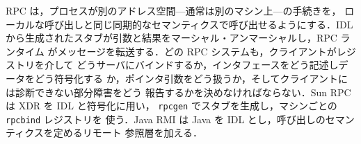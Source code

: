 \documentclass[../main.tex]{subfiles}
\begin{document}
\begin{keypoint}[章のまとめ]
  RPC は，プロセスが別のアドレス空間---通常は別のマシン上---の手続きを，
  ローカルな呼び出しと同じ同期的なセマンティクスで呼び出せるようにする．IDL
  から生成されたスタブが引数と結果をマーシャル・アンマーシャルし，RPC ランタイム
  がメッセージを転送する．どの RPC システムも，クライアントがレジストリを介して
  どうサーバにバインドするか，インタフェースをどう記述しデータをどう符号化する
  か，ポインタ引数をどう扱うか，そしてクライアントには診断できない部分障害をどう
  報告するかを決めなければならない．Sun RPC は XDR を IDL と符号化に用い，
  \texttt{rpcgen} でスタブを生成し，マシンごとの \texttt{rpcbind} レジストリを
  使う．Java RMI は Java を IDL とし，呼び出しのセマンティクスを定めるリモート
  参照層を加える．
\end{keypoint}
\end{document}
